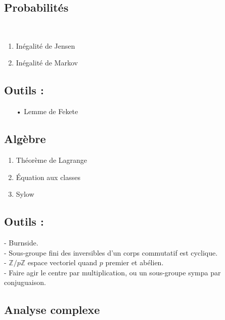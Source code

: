 \documentclass[12pt,a4paper]{article}
\begin{document}
\newpage\begin{center}
\section*{Probabilités} 
\end{center}
~\\
\begin{enumerate}
\item Inégalité de Jensen
\item Inégalité de Markov
\end{enumerate}


\subsection*{Outils :}
\begin{itemize}
\item[•] Lemme de Fekete
\end{itemize}



\newpage
\begin{center}
\section*{Algèbre} 
\end{center}

\begin{enumerate}
\item Théorème de Lagrange
\item Équation aux classes
\item Sylow
\end{enumerate}
\subsection*{Outils :}
- Burnside. \\
- Sous-groupe fini des inversibles d'un corps commutatif est cyclique. \\
- $\mathbb{Z}/p\mathbb{Z}$ espace vectoriel quand $p$ premier et abélien. \\
- Faire agir le centre par multiplication, ou un sous-groupe sympa par conjuguaison.




\newpage
\begin{center}
\section*{Analyse complexe} 
\end{center}
\end{document}
